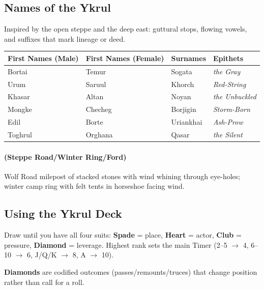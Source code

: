 \subsection{Names of the Ykrul}
\label{sec:ykrul-names}

Inspired by the open steppe and the deep east: guttural stops, flowing vowels, and suffixes that mark lineage or deed.

\begin{longtable}{|p{}|p{}|p{}|p{}|}
\hline
\textbf{First Names (Male)} & \textbf{First Names (Female)} & \textbf{Surnames} & \textbf{Epithets} \\
\hline
Bortai & Temur & Sogata & \textit{the Gray} \\
\hline
Urum & Saruul & Khorch & \textit{Red-String} \\
\hline
Khasar & Altan & Noyan & \textit{the Unbuckled} \\
\hline
Mongke & Checheg & Borjigin & \textit{Storm-Born} \\
\hline
Edil & Borte & Uriankhai & \textit{Ash-Prow} \\
\hline
Toghrul & Orghana & Qasar & \textit{the Silent} \\
\hline
\end{longtable}

\paragraph*{(Steppe Road/Winter Ring/Ford)} Wolf Road milepost of stacked stones with wind whining through eye-holes; winter camp ring with felt tents in horseshoe facing wind.

\subsection{Using the Ykrul Deck}
\label{sec:ykrul-deck}

Draw until you have all four suits: \textbf{Spade} = place, \textbf{Heart} = actor, \textbf{Club} = pressure, \textbf{Diamond} = leverage. Highest rank sets the main Timer (2--5 $\rightarrow$ 4, 6--10 $\rightarrow$ 6, J/Q/K $\rightarrow$ 8, A $\rightarrow$ 10).

\textbf{Diamonds} are codified outcomes (passes/remounts/truces) that change position rather than call for a roll.

